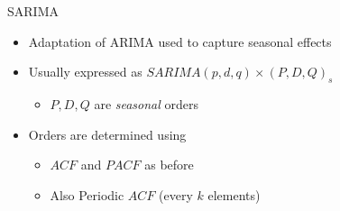 \documentclass[11pt,compress,aspectratio=1610]{beamer}
\begin{document}
\begin{frame}{SARIMA}
\begin{itemize}
    \item Adaptation of ARIMA used to capture seasonal effects
    \item Usually expressed as $SARIMA (p,d,q) \times (P,D,Q)_s$
    \begin{itemize}
        \item $P,D,Q$ are {\it seasonal} orders
    \end{itemize}
    \item Orders are determined using
    \begin{itemize}
        \item $ACF$ and $PACF$ as before
        \item Also Periodic $ACF$ (every $k$ elements)
    \end{itemize}
\end{itemize}
\end{frame}
\end{document}
